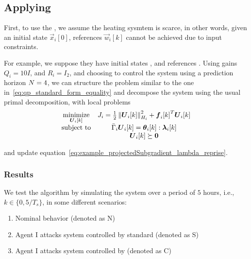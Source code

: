 \documentclass[../main.tex]{subfiles}
\begin{document}
\subsection{Applying \rpdmpcss{}}
First, to use the \rpdmpcss{}, we assume the heating sysmtem is scarce, in other words, given an initial state $\vec{x}_{i}[0]$, references $\vec{w}_{i}[k]$ cannot be achieved due to input constraints.

For example, we suppose they have initial states
,
and references
.
Using gains
$Q_{i}=10I$,
and
$R_{i}=   I_{2}$,
and choosing to control the system using a prediction horizon
$N=4$,
we can structure the \dmpc{} problem similar to the one in~\eqref{eq:qp_standard_form_equality} and decompose the system using the usual primal decomposition, with local problems
\begin{equation}
  \label{eq:houses_scarce_local_problem}
  \begin{matrix}
    \minimize\limits_{\vec{U}_{i}[k]}&\obji=\frac{1}{2}\norm{\vec{U}_{i}[k]}^{2}_{H_{i}} + {\vec{f}_{i}[k]}^{T}\vec{U}_{i}[k]\\
    \mathrm{subject~ to} & \bar{\Gamma}_{i}\vec{U}_{i}[k] = \thetaik:\lambdaik\\
                                     &\vec{U}_{i}[k]\succeq\0
  \end{matrix}
\end{equation}

and update equation~\eqref{eq:example_projectedSubgradient_lambda_reprise}.

\subsubsection{Results}\label{sec:results}
We test the algorithm by simulating the system over a period of
$5$
hours, i.e.,
${k\in\{0,5/T_{s}\}}$,
in some different scenarios:
\begin{enumerate}
  \item Nominal behavior (denoted as N)
  \item Agent I attacks system controlled by standard \dmpc{} (denoted as S)\label{it:case_selfish}
  \item Agent I attacks system controlled by \rpdmpcss{} (denoted as C)\label{it:case_selfish_recovered}
\end{enumerate}
\end{document}
